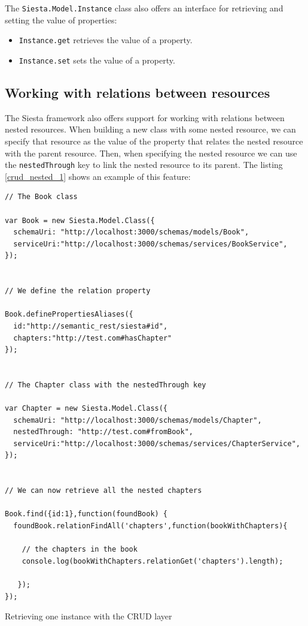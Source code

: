 The \texttt{Siesta.Model.Instance} class also offers an interface for retrieving and setting the value of properties:

\begin{itemize}
\item \texttt{Instance.get} retrieves the value of a property.
\item \texttt{Instance.set} sets the value of a property.
\end{itemize}

\subsection{Working with relations between resources}

The Siesta framework also offers support for working with relations between nested resources. When building a new class
with some nested resource, we can specify that resource as the value of the property that relates the nested resource
with the parent resource. Then, when specifying the nested resource we can use the \texttt{nestedThrough} key to link
the nested resource to its parent. The listing \ref{crud_nested_1} shows an example of this feature:

\begin{table}
\vspace{5 mm}
\begin{lstlisting}
// The Book class

var Book = new Siesta.Model.Class({
  schemaUri: "http://localhost:3000/schemas/models/Book",
  serviceUri:"http://localhost:3000/schemas/services/BookService",
});


// We define the relation property

Book.definePropertiesAliases({
  id:"http://semantic_rest/siesta#id",
  chapters:"http://test.com#hasChapter"
});


// The Chapter class with the nestedThrough key

var Chapter = new Siesta.Model.Class({
  schemaUri: "http://localhost:3000/schemas/models/Chapter",
  nestedThrough: "http://test.com#fromBook",
  serviceUri:"http://localhost:3000/schemas/services/ChapterService",
});


// We can now retrieve all the nested chapters

Book.find({id:1},function(foundBook) {
  foundBook.relationFindAll('chapters',function(bookWithChapters){

    // the chapters in the book
    console.log(bookWithChapters.relationGet('chapters').length);

   });
});
\end{lstlisting} 
\vspace{5 mm}
\caption{Retrieving one instance with the CRUD layer}
\label{crud_nested_1}
\end{table}

